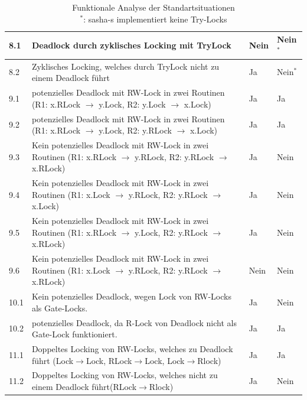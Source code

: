 \begin{table}[H]
\begin{tabular}{|l|l|l|l|}
    8.1 & Deadlock durch zyklisches Locking mit TryLock & Nein &Nein$^*$ \\ \hline
    8.2 & \makecell[l]{Zyklisches Locking, welches durch TryLock nicht zu\\einem Deadlock führt} & Ja &Nein$^*$ \\ \hline   
    9.1 & \makecell[l]{potenzielles Deadlock mit RW-Lock in zwei Routinen\\(R1: x.RLock $\to$ y.Lock, R2: y.Lock $\to$ x.Lock)} & Ja & Ja \\ \hline
    9.2 & \makecell[l]{potenzielles Deadlock mit RW-Lock in zwei Routinen\\(R1: x.RLock $\to$ y.Lock, R2: y.RLock $\to$ x.Lock)} & Ja & Ja \\ \hline
    9.3 & \makecell[l]{Kein potenzielles Deadlock mit RW-Lock in zwei Routinen\\(R1: x.RLock $\to$ y.RLock, R2: y.RLock $\to$ x.RLock)} & Ja & Nein \\ \hline
    9.4 & \makecell[l]{Kein potenzielles Deadlock mit RW-Lock in zwei Routinen\\(R1: x.Lock $\to$ y.RLock, R2: y.RLock $\to$ x.Lock)} & Ja & Nein \\ \hline
    9.5 & \makecell[l]{Kein potenzielles Deadlock mit RW-Lock in zwei Routinen\\(R1: x.RLock $\to$ y.Lock, R2: y.RLock $\to$ x.RLock)} & Ja & Nein \\ \hline
    9.6 & \makecell[l]{Kein potenzielles Deadlock mit RW-Lock in zwei Routinen\\(R1: x.Lock $\to$ y.RLock, R2: y.RLock $\to$ x.RLock)} & Nein & Nein \\ \hline
    10.1 & \makecell[l]{Kein potenzielles Deadlock, wegen Lock von RW-Locks\\als Gate-Locks.} & Ja & Nein \\ \hline
    10.2 & \makecell[l]{potenzielles Deadlock, da R-Lock von Deadlock nicht als\\Gate-Lock funktioniert.} & Ja & Ja \\ \hline
    11.1 & \makecell[l]{Doppeltes Locking von RW-Locks, welches zu Deadlock führt\\(Lock$\to$Lock, RLock$\to$Lock, Lock$\to$Rlock)} & Ja & Ja \\ \hline
    11.2 & \makecell[l]{Doppeltes Locking von RW-Locks, welches nicht zu einem\\Deadlock führt(RLock$\to$Rlock)} & Ja & Nein \\ \hline
\end{tabular}
\caption{Funktionale Analyse der Standartsituationen\\$^*$: sasha-s implementiert keine Try-Locks}
\label{Tab::Analyse:Functional.Standart}
\end{table}
